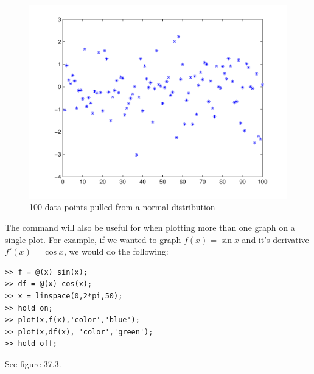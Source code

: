 \begin{figure}
\begin{center}
\begin{matlab}
\includegraphics[scale=0.5]{./FiguresMAT/plot3}
\end{matlab}
\caption{100 data points pulled from a normal distribution}
\end{center}
\end{figure}

The  command will also be useful for when plotting more than one graph on a single plot.  For example, if we wanted to graph $f(x) = \sin{x}$ and it's derivative $f'(x) = \cos{x}$, we would do the following:

\begin{matlab}
\begin{lstlisting}[style=matlab]
>> f = @(x) sin(x);
>> df = @(x) cos(x);
>> x = linspace(0,2*pi,50);
>> hold on;
>> plot(x,f(x),'color','blue');
>> plot(x,df(x), 'color','green');
>> hold off;
\end{lstlisting}
\end{matlab}

See figure 37.3.

